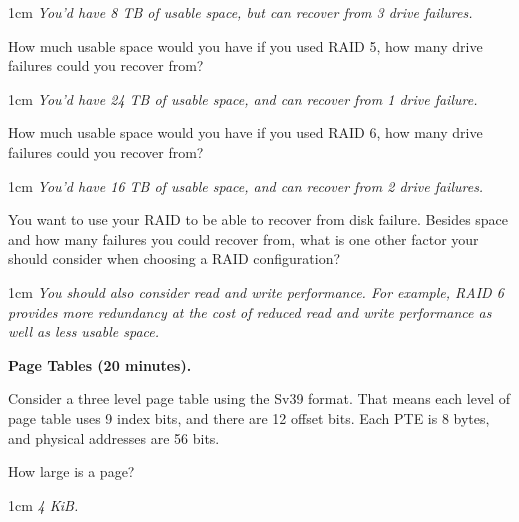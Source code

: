 \documentclass[12pt]{article}
\newenvironment{answer}{\begin{adjustwidth}{1cm}{}\itshape}{\end{adjustwidth}}
\begin{document}
\begin{answer}
  You'd have 8 TB of usable space, but can recover from 3 drive failures.
\end{answer}

\vspace{1em}

How much usable space would you have if you used RAID 5, how many drive
failures could you recover from?

\begin{answer}
  You'd have 24 TB of usable space, and can recover from 1 drive failure.
\end{answer}

\vspace{1em}

How much usable space would you have if you used RAID 6, how many drive
failures could you recover from?

\begin{answer}
  You'd have 16 TB of usable space, and can recover from 2 drive failures.
\end{answer}

\vspace{1em}

You want to use your RAID to be able to recover from disk failure.
Besides space and how many failures you could recover from, what is one other
factor your should consider when choosing a RAID configuration?

\begin{answer}
  You should also consider read and write performance. For example, RAID 6
  provides more redundancy at the cost of reduced read and write performance
  as well as less usable space.
\end{answer}

\newpage

\textbf{Page Tables (20 minutes).}

\vspace{1em}

Consider a three level page table using the Sv39 format. That means each level of
page table uses 9 index bits, and there are 12 offset bits. Each PTE is 8 bytes,
and physical addresses are 56 bits.

\vspace{1em}

How large is a page?

\begin{answer}
  4 KiB.
\end{answer}
\end{document}
